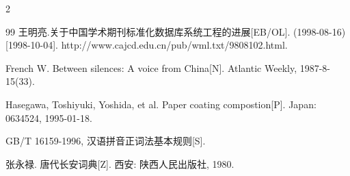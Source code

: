 \documentclass[authordraft]{ctacn}%
\begin{document}
\begin{multicols}{2}
\begin{thebibliography}{99}
	王明亮.关于中国学术期刊标准化数据库系统工程的进展[EB/OL]. (1998-08-16)[1998-10-04]. http://www.cajcd.edu.cn/pub/wml.txt/9808102.html.
	
	French W. Between silences: A voice from China[N]. Atlantic Weekly, 1987-8-15(33).
	
	Hasegawa, Toshiyuki, Yoshida, et al. Paper coating compostion[P]. Japan: 0634524, 1995-01-18.
	
	GB/T 16159-1996, 汉语拼音正词法基本规则[S].
	
	张永禄. 唐代长安词典[Z]. 西安: 陕西人民出版社, 1980.

\end{thebibliography}\vspace{-20pt}



\end{multicols}
\end{document}
